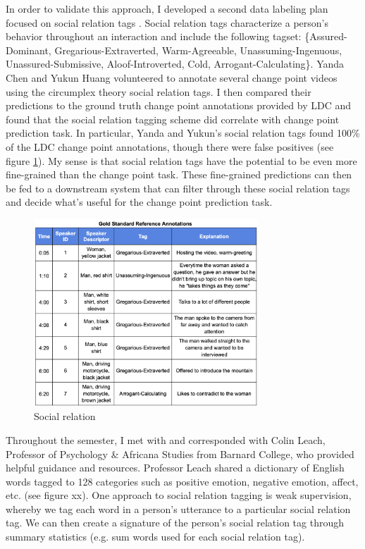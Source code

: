 \documentclass[12pt]{article}
\begin{document}
In order to validate this approach, I developed a second data labeling plan focused on social relation tags \cite{Morrill_2022b}. Social relation tags characterize a person's behavior throughout an interaction and include the following tagset: \{Assured-Dominant, Gregarious-Extraverted, Warm-Agreeable, Unassuming-Ingenuous, Unassured-Submissive, Aloof-Introverted, Cold, Arrogant-Calculating\}. Yanda Chen and Yukun Huang volunteered to annotate several change point videos using the circumplex theory social relation tags. I then compared their predictions to the ground truth change point annotations provided by LDC and found that the social relation tagging scheme did correlate with change point prediction task. In particular, Yanda and Yukun's social relation tags found 100\% of the LDC change point annotations, though there were false positives (see figure \ref{fig:social_relation}). My sense is that social relation tags have the potential to be even more fine-grained than the change point task. These fine-grained predictions can then be fed to a downstream system that can filter through these social relation tags and decide what's useful for the change point prediction task.

\begin{figure}[H]
    \centering
    \includegraphics[width=0.75\textwidth]{social_relation_tags.png}
    \caption{Social relation}
    \label{fig:social_relation}
\end{figure}

Throughout the semester, I met with and corresponded with Colin Leach, Professor of Psychology \& Africana Studies from Barnard College, who provided helpful guidance and resources. Professor Leach shared a dictionary of English words tagged to 128 categories such as positive emotion, negative emotion, affect, etc. (see figure xx). One approach to social relation tagging is weak supervision, whereby we tag each word in a person's utterance to a particular social relation tag. We can then create a signature of the person's social relation tag through summary statistics (e.g. sum words used for each social relation tag).  
\end{document}
